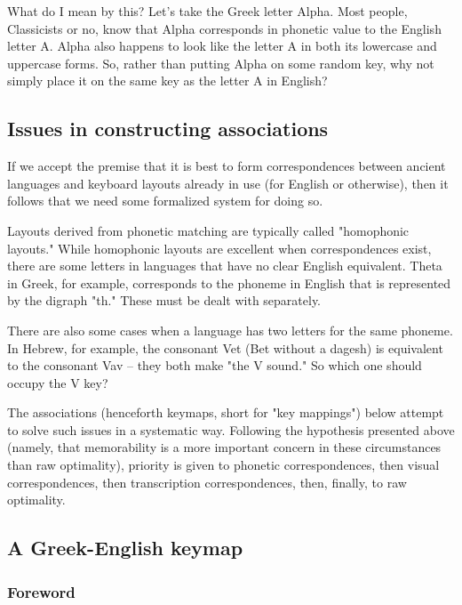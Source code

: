 \documentclass[11pt]{article}
\begin{document}
What do I mean by this? Let's take the Greek letter Alpha. Most people, Classicists or no, know that Alpha corresponds in phonetic value to the English letter A. Alpha also happens to look like the letter A in both its lowercase and uppercase forms. So, rather than putting Alpha on some random key, why not simply place it on the same key as the letter A in English?

\subsection{Issues in constructing associations}
\label{sec:orgfcfbcaf}

If we accept the premise that it is best to form correspondences between ancient languages and keyboard layouts already in use (for English or otherwise), then it follows that we need some formalized system for doing so.

Layouts derived from phonetic matching are typically called "homophonic layouts." While homophonic layouts are excellent when correspondences exist, there are some letters in languages that have no clear English equivalent. Theta in Greek, for example, corresponds to the phoneme in English that is represented by the digraph "th." These must be dealt with separately.

There are also some cases when a language has two letters for the same phoneme. In Hebrew, for example, the consonant Vet (Bet without a dagesh) is equivalent to the consonant Vav -- they both make "the V sound." So which one should occupy the V key?

The associations (henceforth keymaps, short for "key mappings") below attempt to solve such issues in a systematic way. Following the hypothesis presented above (namely, that memorability is a more important concern in these circumstances than raw optimality), priority is given to phonetic correspondences, then visual correspondences, then transcription correspondences, then, finally, to raw optimality.

\subsection{A Greek-English keymap}
\label{sec:org1c8405d}

\subsubsection{Foreword}
\label{sec:org20621e2}
\end{document}
